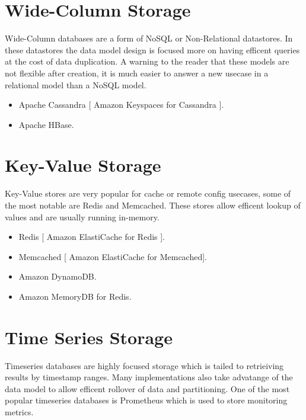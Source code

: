 \documentclass{csse4400}
\begin{document}
\section{Wide-Column Storage}


Wide-Column databases are a form of NoSQL or Non-Relational datastores. In these datastores the data model design 
is focused more on having efficent queries at the cost of data duplication. A warning to the reader that these models
are not flexible after creation, it is much easier to answer a new usecase in a relational model than a NoSQL model.

  \begin{itemize}
    \item Apache Cassandra [ Amazon Keyspaces for Cassandra ].
    \item Apache HBase.
  \end{itemize}

\section{Key-Value Storage}

Key-Value stores are very popular for cache or remote config usecases, some of the most notable are Redis and 
Memcached. These stores allow efficent lookup of values and are usually running in-memory.

\begin{itemize}
  \item Redis [ Amazon ElastiCache for Redis ].
  \item Memcached [ Amazon ElastiCache for Memcached].
  \item Amazon DynamoDB.
  \item Amazon MemoryDB for Redis.
\end{itemize}

\section{Time Series Storage}


Timeseries databases are highly focused storage which is tailed to retrieiving results by timestamp ranges.
Many implementations also take advatange of the data model to allow efficent rollover of data and partitioning.
One of the most popular timeseries databases is Prometheus which is used to store monitoring metrics.
\end{document}
